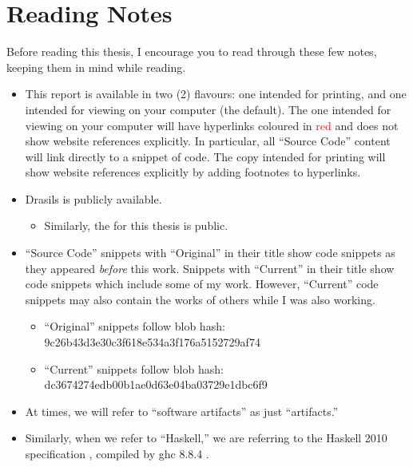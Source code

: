 \chapter{Reading Notes}
\label{chap:reading_notes}

Before reading this thesis, I encourage you to read through these few notes,
keeping them in mind while reading.

\begin{itemize}

    \item This report is available in two (2) flavours: one intended for
          printing, and one intended for viewing on your computer (the default).
          The one intended for viewing on your computer will have hyperlinks
          coloured in \textcolor{red}{red} and does not show website references
          explicitly. In particular, all ``Source Code'' content will link
          directly to a snippet of code. The copy intended for printing will
          show website references explicitly by adding footnotes to hyperlinks.

    \item Drasils  is publicly
          available.

          \begin{itemize}

              \item Similarly, the 
                    for this thesis is public.

          \end{itemize}

    \item ``Source Code'' snippets with ``Original'' in their title show code
          snippets as they appeared \textit{before} this work. Snippets with
          ``Current'' in their title show code snippets which include some of my
          work. However, ``Current'' code snippets may also contain the works of
          others while I was also working.

          \begin{itemize}
              \item ``Original'' snippets follow blob hash:
                    9c26b43d3e30c3f618e534a3f176a5152729af74
              \item ``Current'' snippets follow blob hash:
                    dc3674274edb00b1ae0d63e04ba03729e1dbc6f9
          \end{itemize}


    \item At times, we will refer to ``software artifacts'' as just
         ``artifacts.''

    \item Similarly, when we refer to ``Haskell,'' we are referring to the
          Haskell 2010 specification \cite{Haskell2010}, compiled by \acs{ghc}
          8.8.4 \cite{GHC884}.

\end{itemize}
